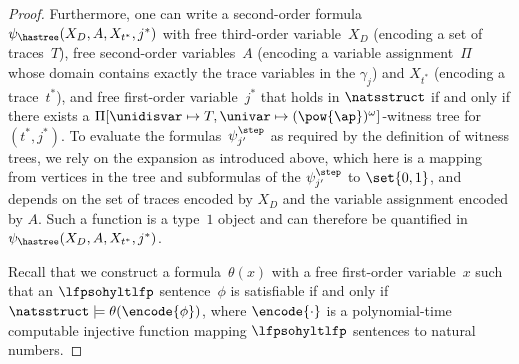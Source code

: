 \begin{proof}
Furthermore, one can write a second-order formula~$\psi_{\hastree}(X_D,A, X_{t^*}, j^*)$ with free third-order variable~$X_D$ (encoding a set of traces~$T$), free second-order variables~$A$ (encoding a variable assignment~$\Pi$ whose domain contains exactly the trace variables in the $\gamma_j$) and $X_{t^*}$ (encoding a trace~$t^*$), and free first-order variable~$j^*$ that holds in $\natsstruct$ if and only if there exists a $\Pi[\unidisvar\mapsto T, \univar\mapsto (\pow{\ap})^\omega]$-witness tree for $(t^*,j^*)$.
To evaluate the formulas~$\psi_{j'}^\step$ as required by the definition of witness trees, we rely on the expansion as introduced above, which here is a mapping from vertices in the tree and subformulas of the $\psi_{j'}^\step$ to $\set{0,1}$, and depends on the set of traces encoded by $X_D$ and the variable assignment encoded by $A$.
Such a function is a type~$1$ object and can therefore be quantified in $\psi_{\hastree}(X_D,A, X_{t^*}, j^*)$.

Recall that we construct a formula~$\theta(x)$ with a free first-order variable~$x$ such that an $\lfpsohyltlfp$ sentence~$\phi$ is satisfiable if and only if $\natsstruct \models \theta(\encode{\phi})$, where $\encode{\cdot}$ is a polynomial-time computable injective function mapping $\lfpsohyltlfp$ sentences to natural numbers.


\end{proof}
